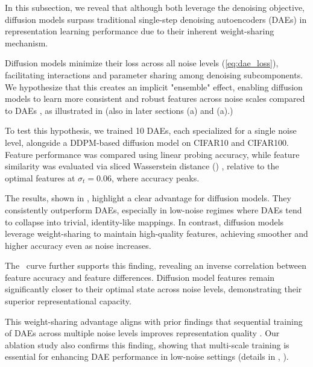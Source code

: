 {In this subsection, we reveal that although both leverage the denoising objective, diffusion models surpass traditional single-step denoising autoencoders (DAEs) in representation learning performance due to their inherent weight-sharing mechanism.

Diffusion models minimize their loss across all noise levels (\ref{eq:dae_loss}), facilitating interactions and parameter sharing among denoising subcomponents. We hypothesize that this creates an implicit "ensemble" effect, enabling diffusion models to learn more consistent and robust features across noise scales compared to DAEs \citep{chen2024deconstructing}, as illustrated in  (also in later sections (a) and (a).)

To test this hypothesis, we trained 10 DAEs, each specialized for a single noise level, alongside a DDPM-based diffusion model on CIFAR10 and CIFAR100. Feature performance was compared using linear probing accuracy, while feature similarity was evaluated via sliced Wasserstein distance (\SWD) \citep{doan2024assessing}, relative to the optimal features at $\sigma_t = 0.06$, where accuracy peaks.

The results, shown in , highlight a clear advantage for diffusion models. They consistently outperform DAEs, especially in low-noise regimes where DAEs tend to collapse into trivial, identity-like mappings. In contrast, diffusion models leverage weight-sharing to maintain high-quality features, achieving smoother and higher accuracy even as noise increases.

The \SWD~curve further supports this finding, revealing an inverse correlation between feature accuracy and feature differences. Diffusion model features remain significantly closer to their optimal state across noise levels, demonstrating their superior representational capacity.

This weight-sharing advantage aligns with prior findings that sequential training of DAEs across multiple noise levels improves representation quality \citep{chandra2014adaptive,geras2014scheduled,zhang2018convolutional}. Our ablation study also confirms this finding, showing that multi-scale training is essential for enhancing DAE performance in low-noise settings (details in , ).

}



